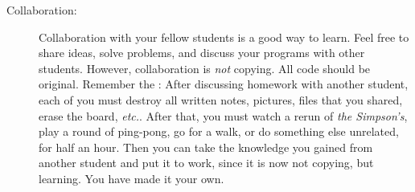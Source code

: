 \documentclass{article}
\begin{document}
\begin{description}
\item [Collaboration:] Collaboration with your fellow students is
  a good way to learn.  Feel free to share ideas, solve problems, and
  discuss your programs with other students.  However, collaboration
  is {\em not} copying.  All code should be original.  Remember the
  : After discussing homework with
  another student, each of you must destroy all written notes,
  pictures, files that you shared, erase the board, {\em
    etc.}.  After that, you must watch a rerun of {\em the Simpson's},
  play a round of ping-pong, go for a walk, or do something else
  unrelated, for half an hour.  Then you can take the knowledge you
  gained from another student and put it to work, since it is now not
  copying, but learning.  You have made it your own.

\end{description}
\end{document}
